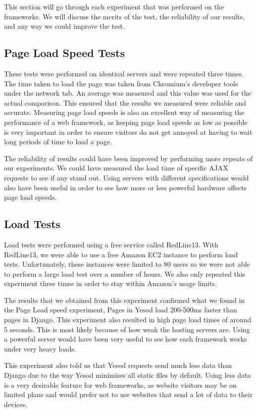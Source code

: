 This section will go through each experiment that was performed
on the frameworks. We will discuss the merits of the test,
the reliability of our results, and any way we could improve
the test.

\subsection{Page Load Speed Tests}

These tests were performed on identical servers and were repeated
three times. The time taken to load the page was taken from Chromium's
developer tools under the network tab. An average was measured and
this value was used for the actual comparison. This ensured that
the results we measured were reliable and accurate. Measuring page
load speeds is also an excellent way of measuring the performance
of a web framework, as keeping page load speeds as low as possible
is very important in order to ensure visitors do not get annoyed at
having to wait long periods of time to load a page.

The reliability of results could have been improved by performing
more repeats of our experiments. We could have measured the load
time of specific AJAX requests to see if any stand out. Using
servers with different specifications would also have been useful
in order to see how more or less powerful hardware affects page
load speeds.

\subsection{Load Tests}

Load tests were performed using a free service called RedLine13. With
RedLine13, we were able to use a free Amazon EC2 instance to perform
load tests. Unfortunately, these instances were limited to 80 users
so we were not able to perform a large load test over a number of hours.
We also only repeated this experiment three times in order to stay
within Amazon's usage limits.

The results that we obtained from this experiment confirmed what we found in the
Page Load speed experiment, Pages in Yesod load 200-500ms faster than pages in Django.
This experiment also resulted in high page load times of around 5 seconds. This
is most likely because of how weak the hosting servers are. Using
a powerful server would have been very useful to see how each framework
works under very heavy loads.

This experiment also told us that Yesod requests send much less data than Django
due to the way Yesod minimises all static files by default.
Using less data is a very desirable feature for web frameworks, as website
visitors may be on limited plans and would prefer not to use websites
that send a lot of data to their devices.

